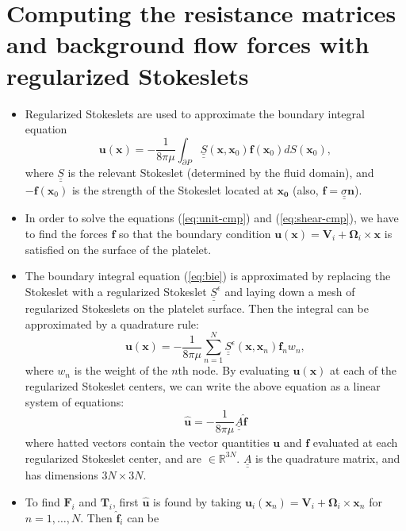 \documentclass{article}
\newcommand{\vect}[1]{\boldsymbol{\mathbf{#1}}}
\newcommand{\mat}[1]{\underline{\underline{#1}}}
\def\R{\mathbb{R}}
\begin{document}
\section{Computing the resistance matrices and background flow forces
  with regularized Stokeslets}
\label{sec:comp-resist-matr}

{\color{gray}
\begin{itemize}
\item Regularized Stokeslets are used to approximate the boundary
  integral equation
  \begin{equation}
    \vect{u}(\vect{x}) = -\frac{1}{8\pi\mu} \int_{\partial P}
    \mat{S}(\vect{x}, \vect{x}_0) \vect{f}(\vect{x}_0) dS(\vect{x}_0),
    \label{eq:bie}
  \end{equation}
  where $\mat{S}$ is the relevant Stokeslet (determined by the fluid
  domain), and $-\vect{f}(\vect{x}_0)$ is the strength of the Stokeslet
  located at $\vect{x_0}$ (also, $\vect{f} = \mat{\sigma}\vect{n}$).
\item In order to solve the equations (\ref{eq:unit-cmp}) and
  (\ref{eq:shear-cmp}), we have to find the forces $\vect{f}$ so that
  the boundary condition $\vect{u}(\vect{x}) = \vect{V}_i +
  \vect{\Omega}_i \times \vect{x}$ is satisfied on the surface of the
  platelet.
\item The boundary integral equation (\ref{eq:bie}) is approximated by
  replacing the Stokeslet with a regularized Stokeslet
  $\mat{S}^\epsilon$ and laying down a mesh of regularized Stokeslets
  on the platelet surface. Then the integral can be approximated by a
  quadrature rule:
  \[
    \vect{u}(\vect{x}) = -\frac{1}{8\pi\mu} \sum_{n =
      1}^N \mat{S}^\epsilon(\vect{x}, \vect{x}_n) \vect{f}_n w_n,
  \]
  where $w_n$ is the weight of the $n$th node. By evaluating
  $\vect{u}(\vect{x})$ at each of the regularized Stokeslet centers,
  we can write the above equation as a linear system of equations:
  \begin{equation}
    \hat{\vect{u}} = -\frac{1}{8\pi\mu} \mat{A}
    \hat{\vect{f}} \label{eq:quad-sys} 
  \end{equation}
  where hatted vectors contain the vector quantities $\vect{u}$ and
  $\vect{f}$ evaluated at each regularized Stokeslet center, and are
  $\in \R^{3N}$. $\mat{A}$ is the quadrature matrix, and has
  dimensions $3N \times 3N$.
\item To find $\vect{F}_i$ and $\vect{T}_i$, first $\hat{\vect{u}}$ is
  found by taking
  $\vect{u}_i(\vect{x}_n) = \vect{V}_i + \vect{\Omega}_i \times
  \vect{x}_n$ for $n = 1, \hdots, N$. Then $\hat{\vect{f}}_i$ can be

\end{itemize}}
\end{document}
